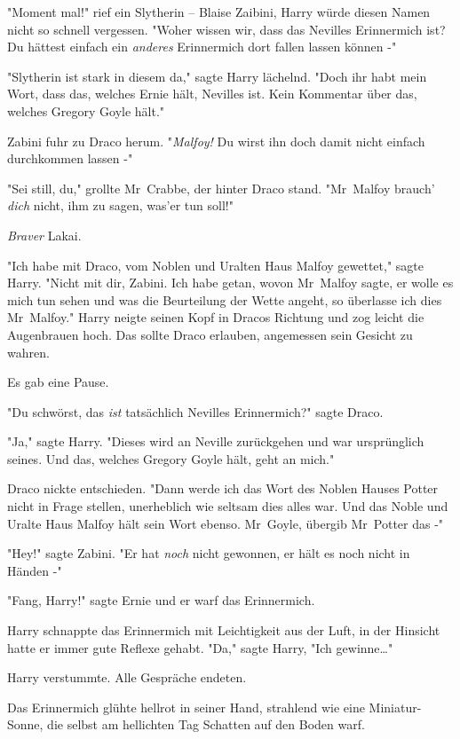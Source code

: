{"Moment mal!" rief ein Slytherin -- Blaise Zaibini, Harry würde diesen Namen nicht so schnell vergessen. "Woher wissen wir, dass das Nevilles Erinnermich ist? Du hättest einfach ein \emph{anderes} Erinnermich dort fallen lassen können -"

"Slytherin ist stark in diesem da," sagte Harry lächelnd. "Doch ihr habt mein Wort, dass das, welches Ernie hält, Nevilles ist. Kein Kommentar über das, welches Gregory Goyle hält."

Zabini fuhr zu Draco herum. "\emph{Malfoy!} Du wirst ihn doch damit nicht einfach durchkommen lassen -"

"Sei still, du," grollte Mr~Crabbe, der hinter Draco stand. "Mr~Malfoy brauch' \emph{dich} nicht, ihm zu sagen, was'er tun soll!"

\emph{Braver} Lakai.

"Ich habe mit Draco, vom Noblen und Uralten Haus Malfoy gewettet," sagte Harry. "Nicht mit dir, Zabini. Ich habe getan, wovon Mr~Malfoy sagte, er wolle es mich tun sehen und was die Beurteilung der Wette angeht, so überlasse ich dies Mr~Malfoy." Harry neigte seinen Kopf in Dracos Richtung und zog leicht die Augenbrauen hoch. Das sollte Draco erlauben, angemessen sein Gesicht zu wahren.

Es gab eine Pause.

"Du schwörst, das \emph{ist} tatsächlich Nevilles Erinnermich?" sagte Draco.

"Ja," sagte Harry. "Dieses wird an Neville zurückgehen und war ursprünglich seines. Und das, welches Gregory Goyle hält, geht an mich."

Draco nickte entschieden. "Dann werde ich das Wort des Noblen Hauses Potter nicht in Frage stellen, unerheblich wie seltsam dies alles war. Und das Noble und Uralte Haus Malfoy hält sein Wort ebenso. Mr~Goyle, übergib Mr~Potter das -"

"Hey!" sagte Zabini. "Er hat \emph{noch} nicht gewonnen, er hält es noch nicht in Händen -"

"Fang, Harry!" sagte Ernie und er warf das Erinnermich.

Harry schnappte das Erinnermich mit Leichtigkeit aus der Luft, in der Hinsicht hatte er immer gute Reflexe gehabt. "Da," sagte Harry, "Ich gewinne…"

Harry verstummte. Alle Gespräche endeten.

Das Erinnermich glühte hellrot in seiner Hand, strahlend wie eine Miniatur-Sonne, die selbst am hellichten Tag Schatten auf den Boden warf.

}
